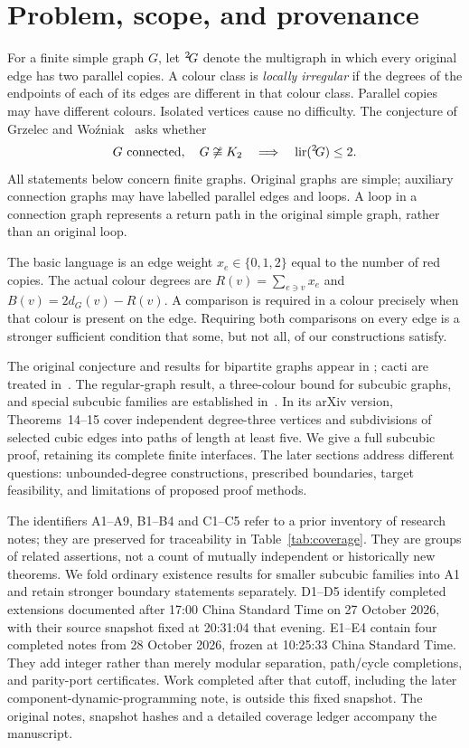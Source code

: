 \section{Problem, scope, and provenance}\label{sec:overview}

For a finite simple graph $G$, let ${}^{2}\!G$ denote the multigraph in
which every original edge has two parallel copies. A colour class is
\emph{locally irregular} if the degrees of the endpoints of each of its
edges are different in that colour class. Parallel copies may have
different colours. Isolated vertices cause no difficulty. The conjecture
of Grzelec and Wo\'zniak~\cite{GW23} asks whether
\[
 G\text{ connected},\quad G\not\cong K_2
 \quad\Longrightarrow\quad \operatorname{lir}({}^{2}\!G)\le2.
\]
All statements below concern finite graphs. Original graphs are simple;
auxiliary connection graphs may have labelled parallel edges and loops.
A loop in a connection graph represents a return path in the original
simple graph, rather than an original loop.

The basic language is an edge weight $x_e\in\{0,1,2\}$ equal to the
number of red copies. The actual colour degrees are
$R(v)=\sum_{e\ni v}x_e$ and $B(v)=2d_G(v)-R(v)$. A comparison is required
in a colour precisely when that colour is present on the edge. Requiring
both comparisons on every edge is a stronger sufficient condition that
some, but not all, of our constructions satisfy.

The original conjecture and results for bipartite graphs appear in
\cite{GW23}; cacti are treated in~\cite{GW24}. The regular-graph result,
a three-colour bound for subcubic graphs, and special subcubic families
are established in~\cite{GOW26}. In its arXiv version, Theorems~14--15
cover independent degree-three vertices and subdivisions of selected
cubic edges into paths of length at least five. We give a full subcubic
proof, retaining its complete finite interfaces. The later sections
address different questions: unbounded-degree constructions, prescribed
boundaries, target feasibility, and limitations of proposed proof methods.

The identifiers A1--A9, B1--B4 and C1--C5 refer to a prior inventory of
research notes; they are preserved for traceability in
Table~\ref{tab:coverage}. They are groups of related assertions, not a
count of mutually independent or historically new theorems. We fold
ordinary existence results for smaller subcubic families into A1 and
retain stronger boundary statements separately. D1--D5 identify completed
extensions documented after 17:00 China Standard Time on 27 October
2026, with their source snapshot fixed at 20:31:04 that evening.
E1--E4 contain four completed notes from 28 October 2026, frozen at
10:25:33 China Standard Time. They add integer rather than merely
modular separation, path/cycle completions, and parity-port certificates.
Work completed after that cutoff, including the later component-dynamic-programming
note, is outside this fixed snapshot.
The original notes, snapshot hashes and a detailed coverage ledger
accompany the manuscript.

